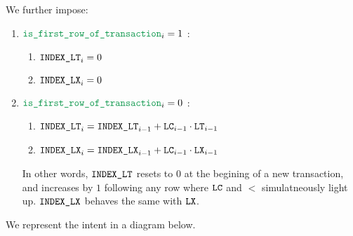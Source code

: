 \noindent We further impose:
\begin{enumerate}
    \item \If $\locIsFirstRowOfTransaction _{i} = 1$ \Then:
        \begin{enumerate}
            \item $\texttt{INDEX\_LT} _{i} = 0$
            \item $\texttt{INDEX\_LX} _{i} = 0$
        \end{enumerate}
    \item \If $\locIsFirstRowOfTransaction _{i} = 0$ \Then:
        \begin{enumerate}
            \item $\texttt{INDEX\_LT} _{i} = \texttt{INDEX\_LT} _{i - 1} + \texttt{LC} _{i - 1} \cdot \texttt{LT} _{i - 1}$
            \item $\texttt{INDEX\_LX} _{i} = \texttt{INDEX\_LX} _{i - 1} + \texttt{LC} _{i - 1} \cdot \texttt{LX} _{i - 1}$
        \end{enumerate}
        \saNote{}
        In other words, $\texttt{INDEX\_LT}$ resets to $0$ at the begining of a new transaction,
        and increases by $1$ following any row where $\texttt{LC}$ and $\lt$ simulatneously light up.
        $\texttt{INDEX\_LX}$ behaves the same with $\texttt{LX}$.
\end{enumerate}
We represent the intent in a diagram below.


